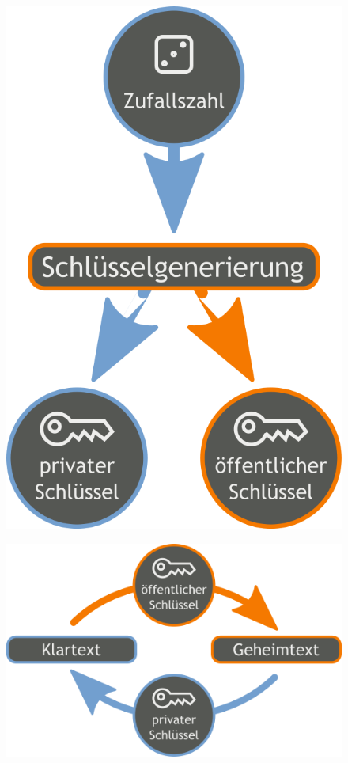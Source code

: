 \documentclass[xcolor=dvipsnames, aspectratio=169]{beamer}
\begin{document}
\begin{frame}
	\begin{figure}
	\center
	\includegraphics[scale=0.2]{private_keygeneration}
	\end{figure}
\end{frame}
\begin{frame}
	\begin{figure}
	\center
	\includegraphics[scale=0.2]{public_key_cryptography}
	\end{figure}
\end{frame}
\end{document}
